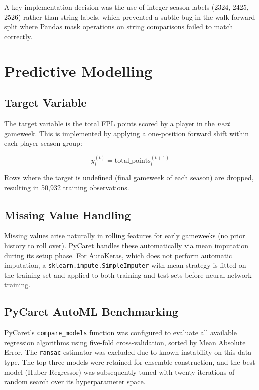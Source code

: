 \documentclass[11pt,english,listoffigures,listoftables]{tfgetsinf}
\begin{document}
A key implementation decision was the use of integer season labels (2324, 2425, 2526) rather than string labels, which prevented a subtle bug in the walk-forward split where Pandas mask operations on string comparisons failed to match correctly.

\section{Predictive Modelling}

\subsection{Target Variable}

The target variable is the total FPL points scored by a player in the \emph{next} gameweek. This is implemented by applying a one-position forward shift within each player-season group:

\begin{equation}
y_i^{(t)} = \text{total\_points}_i^{(t+1)}
\end{equation}

Rows where the target is undefined (final gameweek of each season) are dropped, resulting in 50,932 training observations.

\subsection{Missing Value Handling}

Missing values arise naturally in rolling features for early gameweeks (no prior history to roll over). PyCaret handles these automatically via mean imputation during its setup phase. For AutoKeras, which does not perform automatic imputation, a \texttt{sklearn.impute.SimpleImputer} with mean strategy is fitted on the training set and applied to both training and test sets before neural network training.

\subsection{PyCaret AutoML Benchmarking}

PyCaret's \texttt{compare\_models} function was configured to evaluate all available regression algorithms using five-fold cross-validation, sorted by Mean Absolute Error. The \texttt{ransac} estimator was excluded due to known instability on this data type. The top three models were retained for ensemble construction, and the best model (Huber Regressor) was subsequently tuned with twenty iterations of random search over its hyperparameter space.
\end{document}
